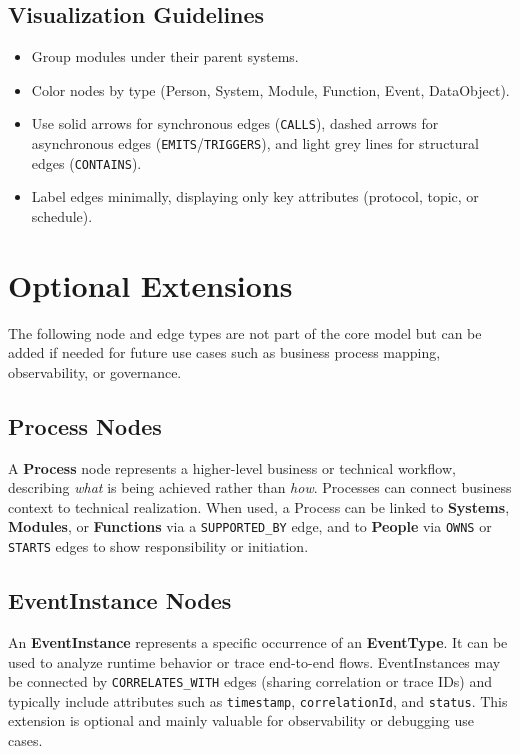\subsection{Visualization Guidelines}
\begin{itemize}
    \item Group modules under their parent systems.
    \item Color nodes by type (Person, System, Module, Function, Event, DataObject).
    \item Use solid arrows for synchronous edges (\texttt{CALLS}), dashed arrows for asynchronous edges (\texttt{EMITS}/\texttt{TRIGGERS}), and light grey lines for structural edges (\texttt{CONTAINS}).
    \item Label edges minimally, displaying only key attributes (protocol, topic, or schedule).
\end{itemize}

\section{Optional Extensions}

The following node and edge types are not part of the core model but can be added if needed for future use cases such as business process mapping, observability, or governance.

\subsection{Process Nodes}

A \textbf{Process} node represents a higher-level business or technical workflow, describing \emph{what} is being achieved rather than \emph{how}. 
Processes can connect business context to technical realization.  
When used, a Process can be linked to \textbf{Systems}, \textbf{Modules}, or \textbf{Functions} via a \texttt{SUPPORTED\_BY} edge, and to \textbf{People} via \texttt{OWNS} or \texttt{STARTS} edges to show responsibility or initiation.

\subsection{EventInstance Nodes}

An \textbf{EventInstance} represents a specific occurrence of an \textbf{EventType}. 
It can be used to analyze runtime behavior or trace end-to-end flows.  
EventInstances may be connected by \texttt{CORRELATES\_WITH} edges (sharing correlation or trace IDs) and typically include attributes such as \texttt{timestamp}, \texttt{correlationId}, and \texttt{status}. 
This extension is optional and mainly valuable for observability or debugging use cases.



